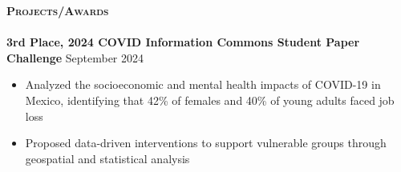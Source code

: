 \documentclass[a4paper]{article}
\newcommand{\lineunder} {
    \vspace*{-8pt} \\
    \hspace*{-18pt} \hrulefill \\
}
\newcommand{\header} [1] {
    {\hspace*{-18pt}\vspace*{6pt} \textsc{#1}}
    \vspace*{-6pt} \lineunder
}
\begin{document}

\vspace*{1mm}

\header{\textbf{Projects/Awards}}

\textbf{3rd Place, 2024 COVID Information Commons Student Paper Challenge} \hfill September 2024 \\
    \begin{itemize}[noitemsep]
        \item Analyzed the socioeconomic and mental health impacts of COVID-19 in Mexico, identifying that 42\% of females and 40\% of young adults faced job loss
        \item Proposed data-driven interventions to support vulnerable groups through geospatial and statistical analysis
    \end{itemize}
\end{document}
